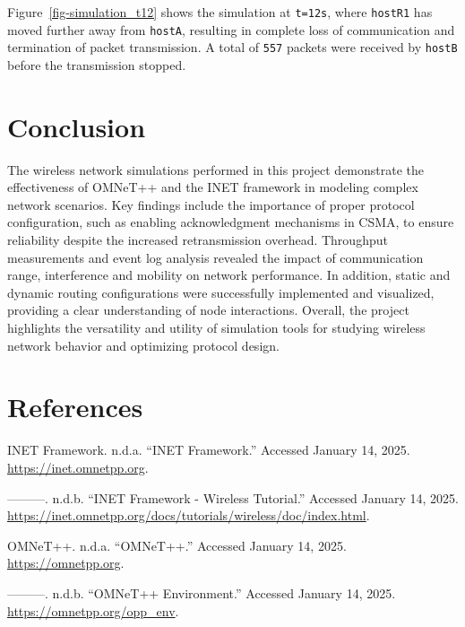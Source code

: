 \documentclass[
  letterpaper,
  DIV=11,
  numbers=noendperiod]{scrartcl}
\newlength{\cslhangindent}
\newenvironment{CSLReferences}[2] %
 {\begin{list}{}{%
  \setlength{\itemindent}{0pt}
  \setlength{\leftmargin}{0pt}
  \setlength{\parsep}{0pt}
  \ifodd #1
   \setlength{\leftmargin}{\cslhangindent}
   \setlength{\itemindent}{-1\cslhangindent}
  \fi
  \setlength{\itemsep}{#2\baselineskip}}}
 {\end{list}}
\begin{document}
Figure~\ref{fig-simulation_t12} shows the simulation at \texttt{t=12s},
where \texttt{hostR1} has moved further away from \texttt{hostA},
resulting in complete loss of communication and termination of packet
transmission. A total of \texttt{557} packets were received by
\texttt{hostB} before the transmission stopped.

\section{Conclusion}\label{conclusion}

The wireless network simulations performed in this project demonstrate
the effectiveness of OMNeT++ and the INET framework in modeling complex
network scenarios. Key findings include the importance of proper
protocol configuration, such as enabling acknowledgment mechanisms in
CSMA, to ensure reliability despite the increased retransmission
overhead. Throughput measurements and event log analysis revealed the
impact of communication range, interference and mobility on network
performance. In addition, static and dynamic routing configurations were
successfully implemented and visualized, providing a clear understanding
of node interactions. Overall, the project highlights the versatility
and utility of simulation tools for studying wireless network behavior
and optimizing protocol design.

\section{References}\label{references}

\label{refs}
\begin{CSLReferences}{1}{0}
INET Framework. n.d.a. {``{INET Framework}.''} Accessed January 14,
2025. \url{https://inet.omnetpp.org}.

---------. n.d.b. {``{INET Framework - Wireless Tutorial}.''} Accessed
January 14, 2025.
\url{https://inet.omnetpp.org/docs/tutorials/wireless/doc/index.html}.

OMNeT++. n.d.a. {``{OMNeT++}.''} Accessed January 14, 2025.
\url{https://omnetpp.org}.

---------. n.d.b. {``{OMNeT++ Environment}.''} Accessed January 14,
2025. \url{https://omnetpp.org/opp_env}.

\end{CSLReferences}
\end{document}

